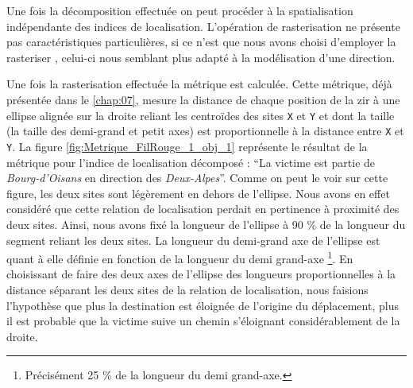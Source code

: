 Une fois la décomposition effectuée on peut procéder à la
spatialisation indépendante des indices de localisation. L'opération
de rasterisation ne présente pas caractéristiques particulières, si ce
n'est que nous avons choisi d'employer la rasteriser
, celui-ci nous semblant plus adapté à la
modélisation d'une direction.

Une fois la rasterisation effectuée la métrique
 est calculée. Cette métrique, déjà
présentée dans le \autoref{chap:07}, mesure la distance de chaque
position de la \ac{zir} à une ellipse alignée sur la droite reliant
les centroïdes des sites \texttt{X} et \texttt{Y} et dont la taille
(\ie la taille des demi-grand et petit axes) est proportionnelle à la
distance entre \texttt{X} et \texttt{Y}. La figure
\ref{fig:Metrique_FilRouge_1_obj_1} représente le résultat de la
métrique pour l'indice de localisation décomposé : \enquote{La victime
  est partie de \emph{Bourg-d'Oisans} en direction des
  \emph{Deux-Alpes}}. Comme on peut le voir sur cette figure, les deux
sites sont légèrement en dehors de l'ellipse. Nous avons en effet
considéré que cette relation de localisation perdait en pertinence à
proximité des deux sites. Ainsi, nous avons fixé la longueur de
l'ellipse à 90 \% de la longueur du segment reliant les deux sites. La
longueur du demi-grand axe de l'ellipse est quant à elle définie en
fonction de la longueur du demi grand-axe \footnote{Précisément 25 \%
  de la longueur du demi grand-axe.}. En choisissant de faire des deux
axes de l'ellipse des longueurs proportionnelles à la distance
séparant les deux sites de la relation de localisation, nous faisions
l'hypothèse que plus la destination est éloignée de l'origine du
déplacement, plus il est probable que la victime suive un chemin
s'éloignant considérablement de la droite.

